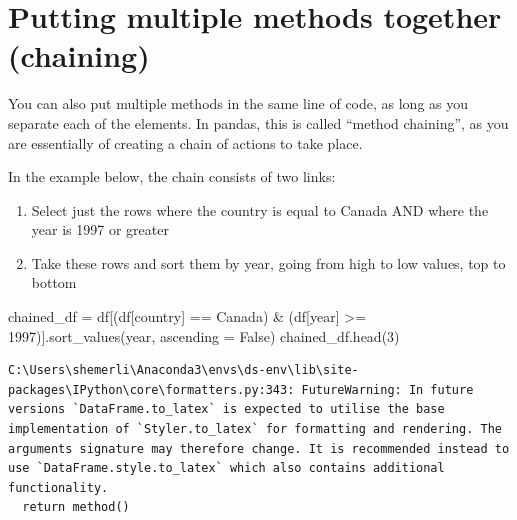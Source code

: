 \documentclass[
  letterpaper,
  DIV=11,
  numbers=noendperiod]{scrreprt}
\newenvironment{Shaded}{\begin{snugshade}}{\end{snugshade}}
\newcommand{\DecValTok}[1]{\textcolor[rgb]{0.68,0.00,0.00}{#1}}
\newcommand{\NormalTok}[1]{\textcolor[rgb]{0.00,0.23,0.31}{#1}}
\newcommand{\OperatorTok}[1]{\textcolor[rgb]{0.37,0.37,0.37}{#1}}
\newcommand{\StringTok}[1]{\textcolor[rgb]{0.13,0.47,0.30}{#1}}
\newcommand{\VariableTok}[1]{\textcolor[rgb]{0.07,0.07,0.07}{#1}}
\providecommand{\tightlist}{%
  \setlength{\itemsep}{0pt}\setlength{\parskip}{0pt}}\usepackage{longtable,booktabs,array}
\begin{document}
\hypertarget{putting-multiple-methods-together-chaining}{%
\section{Putting multiple methods together
(chaining)}\label{putting-multiple-methods-together-chaining}}

You can also put multiple methods in the same line of code, as long as
you separate each of the elements. In pandas, this is called ``method
chaining'', as you are essentially of creating a chain of actions to
take place.

In the example below, the chain consists of two links:

\begin{enumerate}
\def\labelenumi{\arabic{enumi}.}
\tightlist
\item
  Select just the rows where the country is equal to Canada AND where
  the year is 1997 or greater
\item
  Take these rows and sort them by year, going from high to low values,
  top to bottom
\end{enumerate}

\begin{Shaded}
\begin{Highlighting}[]
\NormalTok{chained\_df }\OperatorTok{=}\NormalTok{ df[(df[}\StringTok{\textquotesingle{}country\textquotesingle{}}\NormalTok{] }\OperatorTok{==} \StringTok{\textquotesingle{}Canada\textquotesingle{}}\NormalTok{) }\OperatorTok{\&}\NormalTok{ (df[}\StringTok{\textquotesingle{}year\textquotesingle{}}\NormalTok{] }\OperatorTok{\textgreater{}=} \DecValTok{1997}\NormalTok{)].sort\_values(}\StringTok{\textquotesingle{}year\textquotesingle{}}\NormalTok{, ascending }\OperatorTok{=} \VariableTok{False}\NormalTok{)}
\NormalTok{chained\_df.head(}\DecValTok{3}\NormalTok{)}
\end{Highlighting}
\end{Shaded}

\begin{verbatim}
C:\Users\shemerli\Anaconda3\envs\ds-env\lib\site-packages\IPython\core\formatters.py:343: FutureWarning: In future versions `DataFrame.to_latex` is expected to utilise the base implementation of `Styler.to_latex` for formatting and rendering. The arguments signature may therefore change. It is recommended instead to use `DataFrame.style.to_latex` which also contains additional functionality.
  return method()
\end{verbatim}
\end{document}
